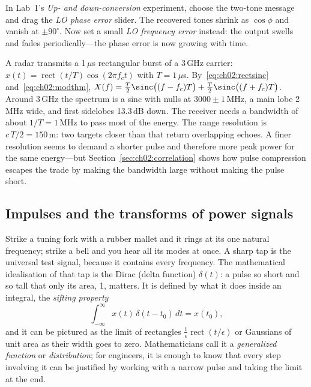 \begin{tryit}
In Lab~1's \emph{Up- and down-conversion} experiment, choose the two-tone message and drag the
\emph{LO phase error} slider. The recovered tones shrink as $\cos\phi$ and vanish at $\pm90^\circ$.
Now set a small \emph{LO frequency error} instead: the output swells and fades periodically---the
phase error is now growing with time.
\end{tryit}

\begin{worked}
A radar transmits a 1\,$\mu$s rectangular burst of a 3\,GHz carrier: $x(t)=\operatorname{rect}(t/T)\cos(2\pi f_ct)$
with $T=1\,\mu$s. By~\eqref{eq:ch02:rectsinc} and~\eqref{eq:ch02:modthm},
$X(f)=\tfrac T2\sinc\big((f-f_c)T\big)+\tfrac T2\sinc\big((f+f_c)T\big)$. Around 3\,GHz the spectrum is a
sinc with nulls at $3000\pm1$\,MHz, a main lobe 2\,MHz wide, and first sidelobes 13.3\,dB down. The
receiver needs a bandwidth of about $1/T=1$\,MHz to pass most of the energy. The range resolution
is $c\,T/2=150$\,m: two targets closer than that return overlapping echoes. A finer resolution
seems to demand a shorter pulse and therefore more peak power for the same energy---but
Section~\ref{sec:ch02:correlation} shows how pulse compression escapes the trade by making the
bandwidth large without making the pulse short.
\end{worked}


\subsection{Impulses and the transforms of power signals}
\label{sec:ch02:delta}

Strike a tuning fork with a rubber mallet and it rings at its one natural frequency; strike a bell
and you hear all its modes at once. A sharp tap is the universal test signal, because it contains
every frequency. The mathematical idealisation of that tap is the Dirac  (delta
function) $\delta(t)$: a pulse so short and so tall that only its area, 1, matters. It is defined by
what it does inside an integral, the \emph{sifting property}
\begin{equation}
\int_{-\infty}^{\infty}x(t)\,\delta(t-t_0)\,dt=x(t_0),
\end{equation}
and it can be pictured as the limit of rectangles $\frac1\epsilon\operatorname{rect}(t/\epsilon)$
or Gaussians of unit area as their width goes to zero. Mathematicians call it a
\emph{generalized function} or \emph{distribution}; for engineers, it is enough to know that every
step involving it can be justified by working with a narrow pulse and taking the limit at the end.

